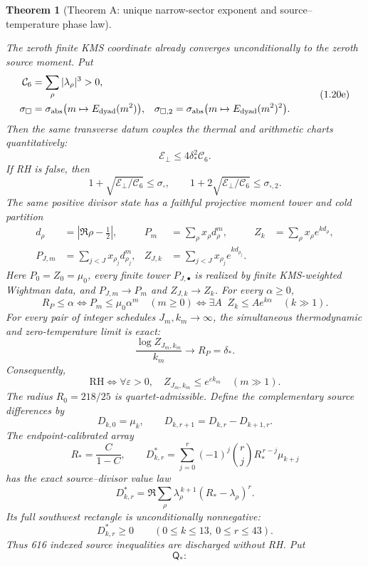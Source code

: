 \documentclass[11pt]{article}
\newtheorem{theorem}{Theorem}[section]
\begin{document}
\begin{theorem}[Theorem A: unique narrow-sector exponent and source--temperature phase law]
\begin{enumerate}[label=\textup{(\roman*)}]
\[\]
The zeroth finite KMS coordinate already converges unconditionally to the zeroth source moment.
Put
\[
 \begin{aligned}
 \mathcal C_6&=\sum_\rho|\lambda_\rho|^3>0,\\
 \sigma_\square&=\sigma_{\rm abs}\bigl(m\mapsto E_{\rm dyad}(m^2)\bigr),
 &\sigma_{\square,2}&=\sigma_{\rm abs}\bigl(m\mapsto E_{\rm dyad}(m^2)^2\bigr).
 \end{aligned}
 \tag{1.20e}
\]
Then the same transverse datum couples the thermal and arithmetic charts quantitatively:
\[
 \mathcal E_\perp\le4\delta_*^2\mathcal C_6.
 \tag{1.20f}
\]
If RH is false, then
\[
 1+\sqrt{\mathcal E_\perp/\mathcal C_6}\le\sigma_\square,
 \qquad
 1+2\sqrt{\mathcal E_\perp/\mathcal C_6}\le\sigma_{\square,2}.
 \tag{1.20g}
\]
The same positive divisor state has a faithful projective moment tower and cold partition
\[
 \begin{aligned}
 d_\rho&=|\Re\rho-\tfrac12|,&
 P_m&=\sum_\rho x_\rho d_\rho^m,&
 Z_k&=\sum_\rho x_\rho e^{k d_\rho},\\
 P_{J,m}&=\sum_{j<J}x_{\rho_j}d_{\rho_j}^m,&
 Z_{J,k}&=\sum_{j<J}x_{\rho_j}e^{k d_{\rho_j}}.
 \end{aligned}
 \tag{1.20h}
\]
Here $P_0=Z_0=\mu_0$, every finite tower $P_{J,\bullet}$ is realized by finite
KMS-weighted Wightman data, and $P_{J,m}\to P_m$ and $Z_{J,k}\to Z_k$.  For every
$\alpha\ge0$,
\[
 R_P\le\alpha
 \Longleftrightarrow
 P_m\le\mu_0\alpha^m\quad(m\ge0)
 \Longleftrightarrow
 \exists A\;\; Z_k\le A e^{k\alpha}\quad(k\gg1).
 \tag{1.20i}
\]
For every pair of integer schedules $J_m,k_m\to\infty$, the simultaneous thermodynamic and
zero-temperature limit is exact:
\[
 \boxed{\quad
 \frac{\log Z_{J_m,k_m}}{k_m}\longrightarrow R_P=\delta_*.
 \quad}
 \tag{1.20ia}
\]
Consequently,
\[
 \mathrm{RH}
 \Longleftrightarrow
 \forall\varepsilon>0,\quad
 Z_{J_m,k_m}\le e^{\varepsilon k_m}\quad(m\gg1).
 \tag{1.20ib}
\]
The radius $R_0=218/25$ is quartet-admissible.
Define the complementary source differences by
\[
 D_{k,0}=\mu_k,\qquad D_{k,r+1}=D_{k,r}-D_{k+1,r}.
 \tag{1.20j}
\]
The endpoint-calibrated array
\[
 R_*=\frac{C}{1-C},\qquad
 D^*_{k,r}=\sum_{j=0}^r(-1)^j\binom rj
 R_*^{\,r-j}\mu_{k+j}
 \tag{1.20k}
\]
has the exact source--divisor value law
\[
 D^*_{k,r}=\Re\sum_\rho
 \lambda_\rho^{\,k+1}(R_*-\lambda_\rho)^r.
 \tag{1.20l}
\]
Its full southwest rectangle is unconditionally nonnegative:
\[
 \boxed{D^*_{k,r}\ge0\qquad(0\le k\le13,\ 0\le r\le43).}
 \tag{1.20m}
\]
Thus 616 indexed source inequalities are discharged without RH.  Put
\[
 \mathsf Q_*:\quad
\]
\end{enumerate}
\end{theorem}
\end{document}
